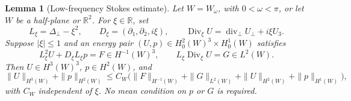 \documentclass[11pt,a4paper]{article}
\newtheorem{lemma}[theorem]{Lemma}
\theoremstyle{remark}
\numberwithin{equation}{section}
\begin{document}
\begin{lemma}[Low-frequency Stokes estimate]
\label{lem:g-edge-lowfreq}
Let $W=W_\omega$, with $0<\omega<\pi$, or let $W$ be a half-plane or
$\mathbb R^2$. For $\xi\in\mathbb R$, set
\[
 L_\xi=\Delta_\perp-\xi^2,\qquad
 D_\xi=(\partial_1,\partial_2,i\xi),\qquad
 \operatorname{Div}_\xi U=\operatorname{div}_\perp U_\perp+i\xi U_3.
\]
Suppose $|\xi|\le1$ and an energy pair
$(U,p)\in H^2_0(W)^3\times H^1_0(W)$ satisfies
\[
 L_\xi^2U+D_\xi L_\xi p=F\in H^{-1}(W)^3,
 \qquad L_\xi\operatorname{Div}_\xi U=G\in L^2(W).
\]
Then $U\in H^3(W)^3$, $p\in H^2(W)$, and
\begin{equation}\label{eq:g-edge-lowfreq}
 \|U\|_{H^3(W)}+\|p\|_{H^2(W)}
 \le C_W\bigl(\|F\|_{H^{-1}(W)}+\|G\|_{L^2(W)}
                 +\|U\|_{H^2(W)}+\|p\|_{H^1(W)}\bigr),
\end{equation}
with $C_W$ independent of $\xi$. No mean condition on $p$ or $G$ is required.
\end{lemma}
\end{document}
